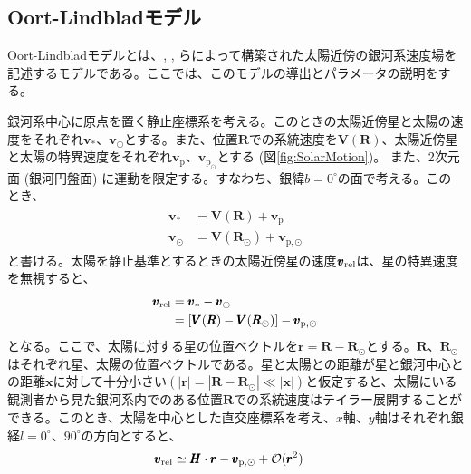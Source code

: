 
\subsection{Oort-Lindbladモデル} %
Oort-Lindbladモデルとは、\cite{Oort1927b}, \cite{Lindblad1927}, \cite{Chandra42}らによって構築された太陽近傍の銀河系速度場を記述するモデルである。ここでは、このモデルの導出とパラメータの説明をする。

銀河系中心に原点を置く静止座標系を考える。このときの太陽近傍星と太陽の速度をそれぞれ$\pmb{v}_{*}、\pmb{v}_{\odot}$とする。また、位置$\pmb{R}$での系統速度を$\pmb{V}(\pmb{R})$、太陽近傍星と太陽の特異速度をそれぞれ$\pmb{v}_{\mathrm{p}}、\pmb{v}_{\mathrm{p}_\odot}$とする (図\ref{fig:SolarMotion})。
また、2次元面 (銀河円盤面) に運動を限定する。すなわち、銀緯$b=0^{\circ}$の面で考える。このとき、
\begin{align}
\begin{aligned}
	\pmb{v}_* &= \pmb{V}(\pmb{R}) + \pmb{v}_{\mathrm{p}} \\
	\pmb{v}_{\odot} &= \pmb{V}(\pmb{R}_{\odot}) + \pmb{v}_{\mathrm{p},\odot}
\end{aligned}
\end{align}
と書ける。太陽を静止基準とするときの太陽近傍星の速度$\pmb{v}_{\rm rel}$は、星の特異速度を無視すると、
\begin{align}
\begin{aligned}
	\pmb{v}_{\rm rel} &= \pmb{v}_* - \pmb{v}_{\odot} \\
	&= [\pmb{V}(\pmb{R}) - \pmb{V}(\pmb{R}_{\odot})] - \pmb{v}_{\mathrm{p},\odot}
\end{aligned}
\end{align}
となる。ここで、太陽に対する星の位置ベクトルを$\pmb{r} = \pmb{R} - \pmb{R}_{\odot}$とする。$\pmb{R}、\pmb{R}_{\odot}$はそれぞれ星、太陽の位置ベクトルである。星と太陽との距離が星と銀河中心との距離$\pmb{x}$に対して十分小さい$(|\pmb{r}| = |\pmb{R}-\pmb{R}_{\odot}| \ll |\pmb{x}|)$と仮定すると、太陽にいる観測者から見た銀河系内でのある位置$\pmb{R}$での系統速度はテイラー展開することができる。このとき、太陽を中心とした直交座標系を考え、$x$軸、$y$軸はそれぞれ銀経$l=0^{\circ}、90^{\circ}$の方向とすると、
\begin{align}
\begin{aligned}
	\pmb{v}_{\rm rel} &\simeq \pmb{H} \cdot \pmb{r} - \pmb{v}_{\mathrm{p},\odot} + \mathcal{O}(\pmb{r}^2) \label{eq:1}
\end{aligned}
\end{align}
